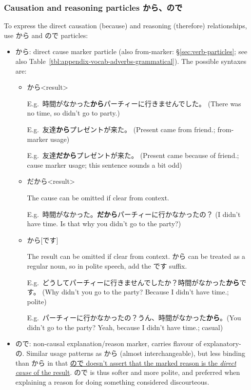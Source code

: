 \documentclass[../nihongo-gakushuu-kyouzai-grammar.tex]{subfiles}
\begin{document}
\subsubsection{Causation and reasoning particles から、ので} \label{sec:causation-reasoning-particles}
To express the direct causation (because) and reasoning (therefore) relationships, use から and ので particles:
\begin{itemize}
    \item から: direct cause marker particle (also from-marker: \S\ref{sec:verb-particles}; see also Table~\ref{tbl:appendix-vocab-adverbs-grammatical}). The possible syntaxes are:
    \begin{itemize}
        \item <direct cause>[だ]から<result>


        E.g.\ 時間がなかった\textbf{から}パーチィーに行きませんでした。 (There was no time, so didn't go to party.)

        E.g.\ 友達\textbf{から}プレゼントが来た。 (Present came from friend.; from-marker usage)

        E.g.\ 友達\textbf{だから}プレゼントが来た。 (Present came because of friend.; cause marker usage; this sentence sounds a bit odd)

        \item{} だから<result>

        The cause can be omitted if clear from context. 

        E.g.\ 時間がなかった。\textbf{だから}パーチィーに行かなかったの？ (I didn't have time. Is that why you didn't go to the party?)
        \item <direct cause>[だ]から[です]

        The result can be omitted if clear from context. から can be treated as a regular noun, so in polite speech, add the です suffix.

        E.g.\ どうしてパーチィーに行きませんでしたか？時間がなかった\textbf{から}です。 (Why didn't you go to the party? Because I didn't have time.; polite)

        E.g.\ パーチィーに行かなかったの？うん、時間がなかった\textbf{から}。(You didn't go to the party? Yeah, because I didn't have time.; casual)
    \end{itemize}
    \item ので: non-causal explanation/reason marker, carries flavour of explanatory-の. Similar usage patterns as から (almost interchangeable), but less binding than から in that \ul{ので doesn't assert that the marked reason is the \emph{direct cause} of the result}. ので is thus softer and more polite, and preferred when explaining a reason for doing something considered discourteous.


\end{itemize}
\end{document}

